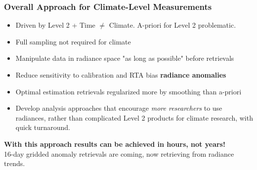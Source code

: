 \documentclass[10pt,t]{beamer}
\begin{document}
\begin{frame}
\frametitle{Overall Approach for Climate-Level Measurements}  
\vspace{-0.1in}
\begin{itemize}
\item Driven by Level 2 + Time \(\neq\) Climate.  A-priori for Level 2 problematic.
\item Full sampling not required for climate
\item Manipulate data in radiance space "as long as possible" before retrievals
\item Reduce sensitivity to calibration and RTA bias \textbf{radiance anomalies}
\item Optimal estimation retrievals regularized more by smoothing than a-priori
\item Develop analysis approaches that encourage \emph{more researchers} to use radiances, rather than complicated Level 2 products for climate research, with quick turnaround.
\end{itemize}

\textbf{With this approach results can be achieved in hours, not years!}   \\

\vspace{0.1in}
16-day gridded anomaly retrievals are coming, now retrieving from radiance trends.
\end{frame}
\end{document}
